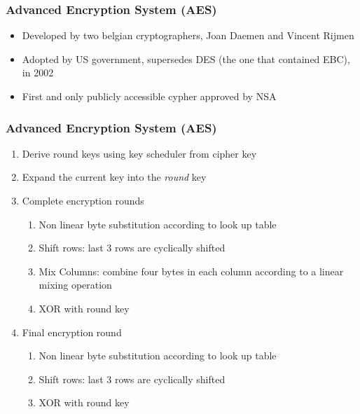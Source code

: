 \documentclass{beamer}
\begin{document}
\begin{frame}
    \frametitle{Advanced Encryption System (AES)}
    \begin{itemize}
        \item \pause Developed by two belgian cryptographers,  Joan Daemen and Vincent Rijmen \pause
        \item Adopted by US government, supersedes DES (the one that contained EBC), in 2002 \pause
        \item First and only publicly accessible cypher approved by NSA 
    \end{itemize}
    
\end{frame}

\begin{frame}
    \frametitle{Advanced Encryption System (AES)}
    \begin{enumerate}
        \item \pause Derive round keys using key scheduler from cipher key \pause
        \item Expand the current key into the \textit{round} key \pause
        \item Complete encryption rounds \pause
        \begin{enumerate}
            \item Non linear byte substitution according to look up table\pause
            \item Shift rows: last 3 rows are cyclically shifted\pause
            \item Mix Columns: combine four bytes in each column according to a linear mixing operation\pause
            \item XOR with round key
        \end{enumerate}
        \item Final encryption round\pause
        \begin{enumerate}
            \item Non linear byte substitution according to look up table\pause
            \item Shift rows: last 3 rows are cyclically shifted\pause
            \item XOR with round key\pause
        \end{enumerate}
    \end{enumerate}
\end{frame}
\end{document}
